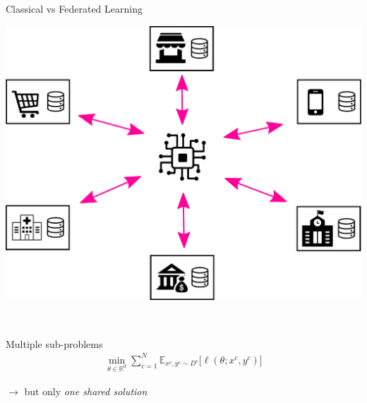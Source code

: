 \documentclass[aspectratio=169,14pt]{beamer}
\begin{document}
\begin{frame}{Classical vs Federated Learning}
  
  \begin{minipage}{0.4\linewidth}
    \begin{center}
      \includegraphics[width=\linewidth]{images/federated-training.pdf}
    \end{center}
    
  \end{minipage}~~~~%
  \begin{minipage}{0.5\linewidth}
    \begin{center}
      Multiple sub-problems
      \begin{align*}
        \min_{\theta \in \mathbb{R}^d} 
        \sum_{c=1}^N \mathbb{E}_{x^c, y^c \sim D^c} \Big[ \ell( \theta; x^c, y^c ) \Big]
      \end{align*}
      
      $\rightarrow$ but only \emph{one shared solution}
    \end{center}
    
  \end{minipage}


\end{frame}
\end{document}
